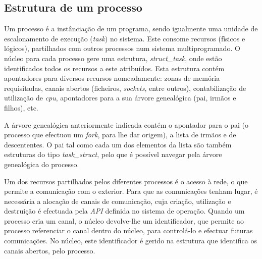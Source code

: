 



\subsection{Estrutura de um processo}

Um processo é a instânciação de um programa, sendo igualmente uma unidade de escalonamento de execução (\textit{task}) no sistema.
Este consome recursos (físicos e lógicos), partilhados com outros processos num sistema multiprogramado.
O núcleo para cada processo gere uma estrutura, \textit{struct\_task}, onde estão identificados todos os recursos a este atribuídos.
Esta estrutura contém apontadores para diversos recursos nomeadamente: zonas de memória requisitadas, canais abertos (ficheiros, \textit{sockets}, entre outros), contabilização de utilização de \textit{cpu}, apontadores para a sua árvore genealógica (pai, irmãos e filhos), etc.

A árvore genealógica anteriormente indicada contém o apontador para o pai (o processo que efectuou um \textit{fork}, para lhe dar origem), a lista de irmãos e de descententes.
O pai tal como cada um dos elementos da lista são também estruturas do tipo \textit{task\_struct}, pelo que é possível navegar pela árvore genealógica do processo.

Um dos recursos partilhados pelos diferentes processos é o acesso à rede, o que permite a comunicação com o exterior.
Para que as comunicações tenham lugar, é necessária a alocação de canais de comunicação, cuja criação, utilização e destruição é efectuada pela \textit{API} definida no sistema de operação.
Quando um processo cria um canal, o núcleo devolve-lhe um identificador, que permite ao processo referenciar o canal dentro do núcleo, para controlá-lo e efectuar futuras comunicações.
No núcleo, este identificador é gerido na estrutura que identifica os canais abertos, pelo processo.

